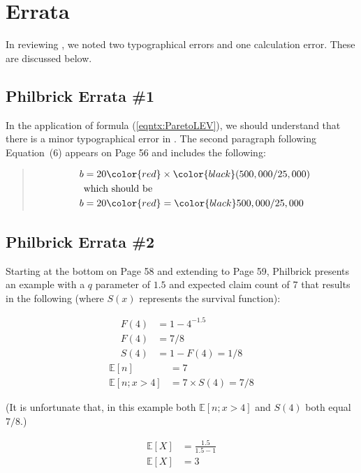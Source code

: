 \section{Errata}\label{sec:errata}
In reviewing \philbrick, we noted two typographical errors and one calculation error. These are discussed below.

\subsection{Philbrick Errata \#1}
	In the application of formula (\ref{eqntx:ParetoLEV}), we should understand that there is a minor typographical error in \philbrick. The second paragraph following Equation~(6) appears on Page 56 and includes the following:
	\begin{quote}
		\begin{align}
		b &= 20 \color{red}\times\color{black} (500,000/25,000)\nonumber\\
		&\text{which should be}\nonumber\\
		b &= 20 \color{red} = \color{black} 500,000/25,000\nonumber
		\end{align}
	\end{quote}

\subsection{Philbrick Errata \#2}
Starting at the bottom on Page 58 and extending to Page 59, Philbrick presents an example with a $q$ parameter of $1.5$ and expected claim count of 7 that results in the following (where $S(x)$ represents the survival function):

\begin{align}
F(4) &= 1 - 4^{-1.5}\nonumber\\
F(4) &= 7/8\nonumber\\
S(4) &= 1 - F(4) = 1/8\nonumber
\end{align}
\begin{align}
\mathbb{E}[n] &= 7\nonumber\\
\mathbb{E}[n; x > 4] &= 7 \times S(4) = 7/8\label{eqn:exfreq}
\end{align}

(It is unfortunate that, in this example both $\mathbb{E}[n; x > 4]$ and $S(4)$ both equal $7/8$.)

\begin{align}
\mathbb{E}[X] &= \frac{1.5}{1.5-1}\nonumber\\
\mathbb{E}[X] &= 3\nonumber
\end{align}

